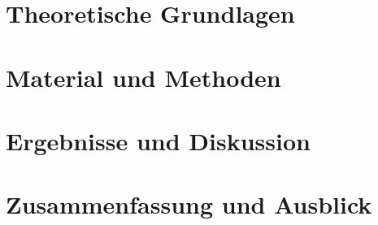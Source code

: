 \documentclass[%
	BCOR12mm, %
	tablecaptionabove %
	]{scrbook}
\begin{document}
\chapter{Theoretische Grundlagen} %
\label{cha:theoretische_grundlagen}
\cite{pradipasena2007temperature}
\citep{gaukel2004untersuchungen}
\citet{young1957d}

\chapter{Material und Methoden} %
\label{cha:material_und_methoden}


\chapter{Ergebnisse und Diskussion} %
\label{cha:ergebnisse_und_diskussion}


\chapter{Zusammenfassung und Ausblick} %
\label{cha:zusammenfassung_und_ausblick}




\appendix
\listoffigures
\listoftables
\end{document}
